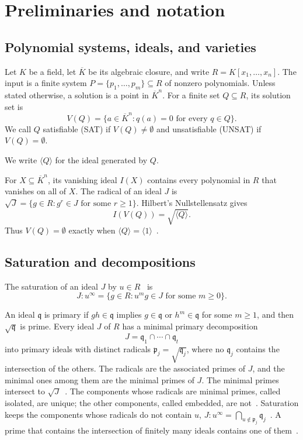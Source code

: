 \section{Preliminaries and notation}
\label{sec:preliminaries}

\subsection{Polynomial systems, ideals, and varieties}

Let $K$ be a field, let $\overline K$ be its algebraic closure, and write
$R=K[x_1,\ldots,x_n]$. The input is a finite system
$P=\{p_1,\ldots,p_m\}\subseteq R$ of nonzero polynomials. Unless stated
otherwise, a solution is a point in $\overline K^n$. For a finite set
$Q\subseteq R$, its solution set is
\[
  V(Q)=\{a\in\overline K^n:q(a)=0\text{ for every }q\in Q\}.
\]
We call $Q$ satisfiable (SAT) if $V(Q)\neq\emptyset$ and
unsatisfiable (UNSAT) if
$V(Q)=\emptyset$.

We write $\langle Q\rangle$ for the ideal generated by $Q$.

For $X\subseteq\overline K^n$, its vanishing ideal $I(X)$ contains every
polynomial in $R$ that vanishes on all of $X$. The radical of an ideal $J$ is
$\sqrt J=\{g\in R:g^r\in J\text{ for some }r\geq1\}$. Hilbert's Nullstellensatz
gives
\[
  I(V(Q))=\sqrt{\langle Q\rangle}.
\]
Thus $V(Q)=\emptyset$ exactly when
$\langle
Q\rangle=\langle1\rangle$~\cite{cox2015ideals,kreuzer2000computational}.

\subsection{Saturation and decompositions}
\label{subsec:decompositions}

The saturation of an ideal $J$ by $u\in R$~\cite[Ch.~4, \S4]{cox2015ideals} is
\[
  J:u^\infty=\{g\in R:u^mg\in J\text{ for some }m\geq0\}.
\]

An ideal $\mathfrak q$ is primary if $gh\in\mathfrak q$ implies
$g\in\mathfrak q$ or $h^m\in\mathfrak q$ for some $m\geq1$, and then
$\sqrt{\mathfrak q}$ is prime. Every ideal $J$ of $R$ has a minimal primary
decomposition~\cite[Ch.~4, \S8]{cox2015ideals}
\[
  J=\mathfrak q_1\cap\cdots\cap\mathfrak q_t
\]
into primary ideals with distinct radicals
$\mathfrak p_j=\sqrt{\mathfrak q_j}$, where no $\mathfrak q_j$ contains the
intersection of the others. The radicals are the
associated primes of $J$, and the minimal ones among them are the minimal
primes of $J$. The minimal primes intersect to
$\sqrt J$~\cite[Ch.~4, \S6]{cox2015ideals}. The components whose radicals
are minimal primes, called isolated, are unique; the other components, called
embedded, are not~\cite[Ch.~4, \S8]{cox2015ideals}. Saturation keeps the
components whose radicals do not contain $u$,
$J:u^\infty=\bigcap_{u\notin\mathfrak p_j}\mathfrak
q_j$~\cite[Prop.~4.9]{atiyah1969introduction}.
A prime that contains the intersection of finitely many ideals contains one
of them~\cite[Prop.~1.11]{atiyah1969introduction}.

